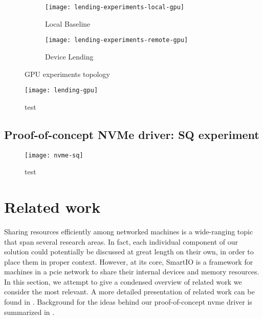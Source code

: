 \begin{figure}
    \centering
    \begin{subfigure}{\linewidth}
        \centering
        \texttt{[image: lending-experiments-local-gpu]}
        \caption{Local Baseline}
    \end{subfigure}
    \par\vspace{5mm}
    \begin{subfigure}{\linewidth}
        \centering
        \texttt{[image: lending-experiments-remote-gpu]}
        \caption{Device Lending}
    \end{subfigure}
    \caption{GPU experiments topology}
\end{figure}
\begin{figure}
    \centering
    \texttt{[image: lending-gpu]}
    \caption{test}
\end{figure}


\subsection{Proof-of-concept NVMe driver: SQ experiment}
\begin{figure}
    \centering
    \texttt{[image: nvme-sq]}
    \caption{test}
\end{figure}




\section{Related work}\label{sec:rw}
Sharing resources efficiently among networked machines is a wide-ranging topic that span several research areas.
%
In fact, each individual component of our solution could potentially be discussed at great length on their own, in order to place them in proper context.
%
However, at its core, SmartIO is a framework for machines in a \gls{pcie} network to share their internal devices and memory resources.
%
In this section, we attempt to give a condensed overview of related work we consider the most relevant.
%
A more detailed presentation of related work can be found in .
%
Background for the ideas behind our proof-of-concept \gls{nvme} driver is summarized in .


